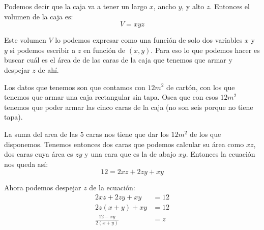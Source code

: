 \documentclass[12pt]{article}
\begin{document}
Podemos decir que la caja va a tener un largo $ x $, ancho $ y $, y alto $ z $. Entonces el volumen de la caja es:
\[
  V=xyz
\]

Este volumen $ V $ lo podemos expresar como una función de solo dos variables $ x $ y $ y $ si podemos escribir a $ z $ en función de $ (x,y) $. Para eso lo que podemos hacer es buscar cuál es el área de de las caras de la caja que tenemos que armar y despejar $ z $ de ahí.

Los datos que tenemos son que contamos con $ 12m^2 $ de cartón, con los que tenemos que armar una caja rectangular sin tapa. Osea que con esos $ 12m^2 $ tenemos que poder armar las cinco caras de la caja (no son seis porque no tiene tapa). 

\begin{center}
\end{center}

La suma del area de las 5 caras nos tiene que dar los $ 12m^2 $ de los que disponemos. Tenemos entonces dos caras que podemos calcular su área como $ xz $, dos caras cuya área es $ zy $ y una cara que es la de abajo $ xy $. Entonces la ecuación nos queda así:
\[
  12 = 2xz + 2zy + xy
\]

Ahora podemos despejar $ z $ de la ecuación:
\begin{align*}
  2xz + 2zy + xy &= 12\\
  2z(x+y)+xy &= 12\\
  \frac{12-xy}{2(x+y)} &= z
\end{align*}
\end{document}
